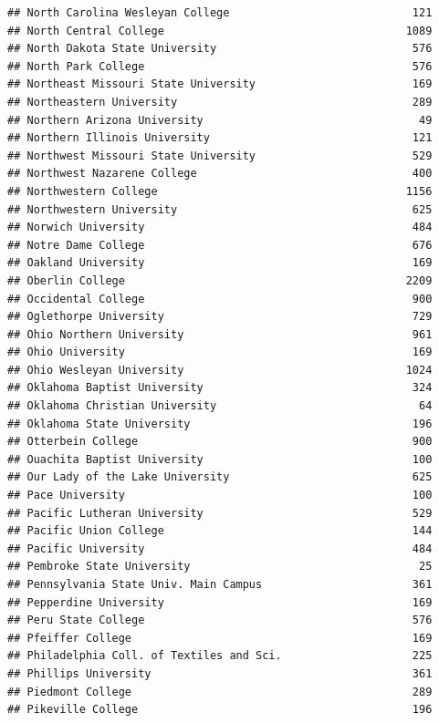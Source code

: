 \documentclass[
]{article}
\begin{document}
\begin{verbatim}
## North Carolina Wesleyan College                            121
## North Central College                                     1089
## North Dakota State University                              576
## North Park College                                         576
## Northeast Missouri State University                        169
## Northeastern University                                    289
## Northern Arizona University                                 49
## Northern Illinois University                               121
## Northwest Missouri State University                        529
## Northwest Nazarene College                                 400
## Northwestern College                                      1156
## Northwestern University                                    625
## Norwich University                                         484
## Notre Dame College                                         676
## Oakland University                                         169
## Oberlin College                                           2209
## Occidental College                                         900
## Oglethorpe University                                      729
## Ohio Northern University                                   961
## Ohio University                                            169
## Ohio Wesleyan University                                  1024
## Oklahoma Baptist University                                324
## Oklahoma Christian University                               64
## Oklahoma State University                                  196
## Otterbein College                                          900
## Ouachita Baptist University                                100
## Our Lady of the Lake University                            625
## Pace University                                            100
## Pacific Lutheran University                                529
## Pacific Union College                                      144
## Pacific University                                         484
## Pembroke State University                                   25
## Pennsylvania State Univ. Main Campus                       361
## Pepperdine University                                      169
## Peru State College                                         576
## Pfeiffer College                                           169
## Philadelphia Coll. of Textiles and Sci.                    225
## Phillips University                                        361
## Piedmont College                                           289
## Pikeville College                                          196

\end{verbatim}
\end{document}
